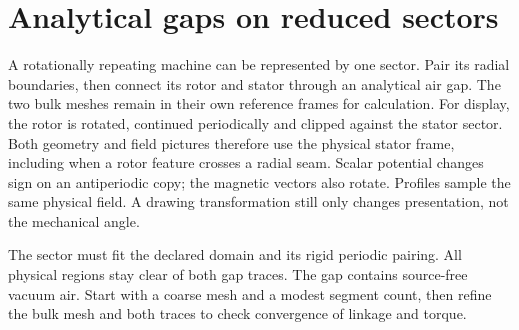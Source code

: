 \section{Analytical gaps on reduced sectors}
\label{sec:sector-gaps}

A rotationally repeating machine can be represented by one sector. Pair its
radial boundaries, then connect its rotor and stator through an analytical air
gap. The two bulk meshes remain in their own reference frames for calculation.
For display, the rotor is rotated, continued periodically and clipped against
the stator sector. Both geometry and field pictures therefore use the physical
stator frame, including when a rotor feature crosses a radial seam. Scalar
potential changes sign on an antiperiodic copy; the magnetic vectors also rotate.
Profiles sample the same physical field. A drawing transformation still only
changes presentation, not the mechanical angle.

The sector must fit the declared domain and its rigid periodic pairing. All
physical regions stay clear of both gap traces. The gap contains source-free
vacuum air. Start with a coarse mesh and a modest segment count, then refine the
bulk mesh and both traces to check convergence of linkage and torque.

\begin{codeexample}[width=0pt]
\end{codeexample}

